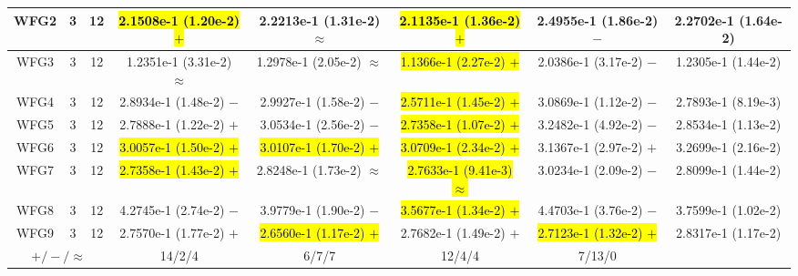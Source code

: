 \documentclass[journal]{IEEEtran}
\begin{document}
\begin{table*}[htbp]
\begin{tabular}{cccccccc}
\hline
\multirow{1}{*}{WFG2}&3&12&\hl{2.1508e-1 (1.20e-2) $+$}&2.2213e-1 (1.31e-2) $\approx$&\hl{2.1135e-1 (1.36e-2) $+$}&2.4955e-1 (1.86e-2) $-$&2.2702e-1 (1.64e-2)\\
\hline
\multirow{1}{*}{WFG3}&3&12&1.2351e-1 (3.31e-2) $\approx$&1.2978e-1 (2.05e-2) $\approx$&\hl{1.1366e-1 (2.27e-2) $+$}&2.0386e-1 (3.17e-2) $-$&1.2305e-1 (1.44e-2)\\
\hline
\multirow{1}{*}{WFG4}&3&12&2.8934e-1 (1.48e-2) $-$&2.9927e-1 (1.58e-2) $-$&\hl{2.5711e-1 (1.45e-2) $+$}&3.0869e-1 (1.12e-2) $-$&2.7893e-1 (8.19e-3)\\
\hline
\multirow{1}{*}{WFG5}&3&12&2.7888e-1 (1.22e-2) $+$&3.0534e-1 (2.56e-2) $-$&\hl{2.7358e-1 (1.07e-2) $+$}&3.2482e-1 (4.92e-2) $-$&2.8534e-1 (1.13e-2)\\
\hline
\multirow{1}{*}{WFG6}&3&12&\hl{3.0057e-1 (1.50e-2) $+$}&\hl{3.0107e-1 (1.70e-2) $+$}&\hl{3.0709e-1 (2.34e-2) $+$}&3.1367e-1 (2.97e-2) $+$&3.2699e-1 (2.16e-2)\\
\hline
\multirow{1}{*}{WFG7}&3&12&\hl{2.7358e-1 (1.43e-2) $+$}&2.8248e-1 (1.73e-2) $\approx$&\hl{2.7633e-1 (9.41e-3) $\approx$}&3.0234e-1 (2.09e-2) $-$&2.8099e-1 (1.44e-2)\\
\hline
\multirow{1}{*}{WFG8}&3&12&4.2745e-1 (2.74e-2) $-$&3.9779e-1 (1.90e-2) $-$&\hl{3.5677e-1 (1.34e-2) $+$}&4.4703e-1 (3.76e-2) $-$&3.7599e-1 (1.02e-2)\\
\hline
\multirow{1}{*}{WFG9}&3&12&2.7570e-1 (1.77e-2) $+$&\hl{2.6560e-1 (1.17e-2) $+$}&2.7682e-1 (1.49e-2) $+$&\hl{2.7123e-1 (1.32e-2) $+$}&2.8317e-1 (1.17e-2)\\
\hline
\multicolumn{3}{c}{$+/-/\approx$}&14/2/4&6/7/7&12/4/4&7/13/0&\\
\bottomrule
\end{tabular}
\label{No Label}
\end{table*}
\end{document}
